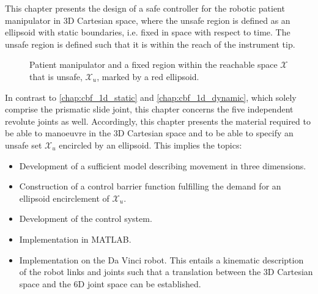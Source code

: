 This chapter presents the design of a safe controller for the  robotic patient manipulator in 3D Cartesian space, where the unsafe region is defined as an ellipsoid with static boundaries, i.e. fixed in space with respect to time. The unsafe region is defined such that it is within the reach of the instrument tip. 
\begin{figure}[H]
\centering
{}%
	\hspace*{5mm}
%
\caption{Patient manipulator and a fixed region within the reachable space $\mathcal{X}$ that is unsafe, $\mathcal{X}_u$, marked by a red ellipsoid.}
\label{fig:robot_hand_3d}
\end{figure}
%
In contrast to \autoref{chap:cbf_1d_static} and \autoref{chap:cbf_1d_dynamic}, which solely comprise the prismatic slide joint, this chapter concerns the five independent revolute joints as well. Accordingly, this chapter presents the material required to be able to manoeuvre in the 3D Cartesian space and to be able to specify an unsafe set $\mathcal{X}_u$ encircled by an ellipsoid. This implies the topics:
\begin{itemize}
\item Development of a sufficient model describing movement in three dimensions.
\item Construction of a control barrier function fulfilling the demand for an ellipsoid encirclement of $\mathcal{X}_u$.
\item Development of the control system.
\item Implementation in MATLAB.
\item Implementation on the Da Vinci robot. This entails a kinematic description of the robot links and joints such that a translation between the 3D Cartesian space and the 6D joint space can be established.
\end{itemize}
